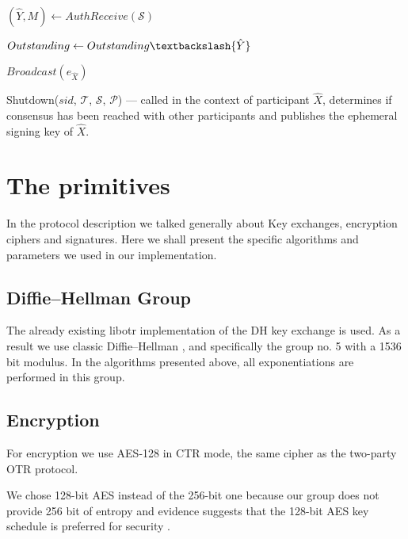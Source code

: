 \begin{algorithm}[H]
{    
    {
        $(\hat{Y}, M) \leftarrow AuthReceive(\mathcal{S})$
        
        {
          \Return{$\perp$}
        }
        \Else
        {
          $Outstanding \leftarrow Outstanding \textbackslash \{\hat{Y}\}$
        }                       
    }
    
    
    $Broadcast(e_{\hat{X}})$
    
  }
  \caption{Shutdown($sid$, $\mathcal{T}$, $\mathcal{S}$, $\mathcal{P}$) --- called in the context of participant $\hat{X}$, determines if consensus has been reached with other participants and publishes the ephemeral signing key of $\hat{X}$.}
  \label{algo:shutdown}
\end{algorithm}

\section{The primitives}
\label{setions:Protocol:primitives}
In the protocol description we talked generally about \dhname Key exchanges, encryption ciphers and signatures.
Here we shall present the specific algorithms and parameters we used in our implementation.

\subsection{Diffie--Hellman Group}
The already existing libotr implementation of the DH key exchange is used.
As a result we use classic Diffie--Hellman , and specifically the group no. 5 \cite{website:dh-rfc} with a 1536 bit modulus.
In the algorithms presented above, all exponentiations are performed in this group.

\subsection{Encryption}

For encryption we use AES-128 in CTR mode, the same cipher as the two-party OTR protocol.

We chose 128-bit AES instead of the 256-bit one because our \dhname group does not provide 256 bit of entropy and evidence suggests that the 128-bit AES key schedule is preferred for security \cite{aes-key-recov} \cite{rijndael-improved-analysis}.

